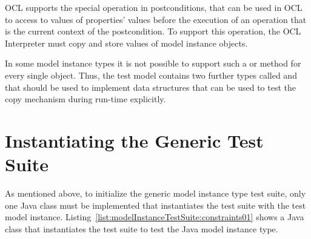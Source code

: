 \acs{OCL} supports the special operation  in postconditions, that can
be used in \acs{OCL} to access to values of properties' values before the 
execution of an operation that is the current context of the postcondition. To 
support this operation, the \acs{OCL} Interpreter must copy and store values of 
model instance objects.

In some model instance types it is not possible to support such a 
or  method for every single object. Thus, the test model contains 
two further types called  and  that should
be used to implement data structures that can be used to test the copy mechanism
during run-time explicitly.



\section{Instantiating the Generic Test Suite}
\label{modelInstanceTestSuite:setupTestSuite}

As mentioned above, to initialize the generic model instance type test suite,
only one Java class must be implemented that instantiates the test suite with
the test model instance. Listing~\ref{list:modelInstanceTestSuite:constraints01}
shows a Java class that instantiates the test suite to test the Java model
instance type.


